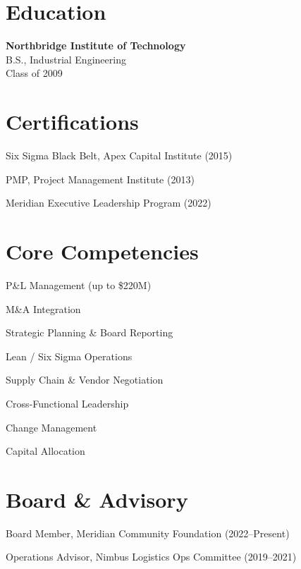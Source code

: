 \documentclass[10pt]{article}
\begin{document}
\noindent
\begin{minipage}[t]{0.305\textwidth}

\section*{Education}
\textbf{\color{navy}Northbridge Institute of Technology}\\[2pt]
{\small B.S., Industrial Engineering}\\
{\small\color{slate}Class of 2009}

\vspace{10pt}

\section*{Certifications}
\begin{cvitems}
\item Six Sigma Black Belt, Apex Capital Institute (2015)
\item PMP, Project Management Institute (2013)
\item Meridian Executive Leadership Program (2022)
\end{cvitems}

\vspace{8pt}

\section*{Core Competencies}
\begin{cvitems}
\item P\&L Management (up to \$220M)
\item M\&A Integration
\item Strategic Planning \& Board Reporting
\item Lean / Six Sigma Operations
\item Supply Chain \& Vendor Negotiation
\item Cross-Functional Leadership
\item Change Management
\item Capital Allocation
\end{cvitems}

\vspace{8pt}

\section*{Board \& Advisory}
\begin{cvitems}
\item Board Member, Meridian Community Foundation (2022--Present)
\item Operations Advisor, Nimbus Logistics Ops Committee (2019--2021)
\end{cvitems}

\end{minipage}%
\end{document}
